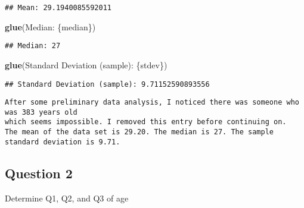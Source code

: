 \documentclass[
]{article}
\newenvironment{Shaded}{\begin{snugshade}}{\end{snugshade}}
\newcommand{\AttributeTok}[1]{\textcolor[rgb]{0.13,0.29,0.53}{#1}}
\newcommand{\CommentTok}[1]{\textcolor[rgb]{0.56,0.35,0.01}{\textit{#1}}}
\newcommand{\ConstantTok}[1]{\textcolor[rgb]{0.56,0.35,0.01}{#1}}
\newcommand{\DecValTok}[1]{\textcolor[rgb]{0.00,0.00,0.81}{#1}}
\newcommand{\FloatTok}[1]{\textcolor[rgb]{0.00,0.00,0.81}{#1}}
\newcommand{\FunctionTok}[1]{\textcolor[rgb]{0.13,0.29,0.53}{\textbf{#1}}}
\newcommand{\NormalTok}[1]{#1}
\newcommand{\OtherTok}[1]{\textcolor[rgb]{0.56,0.35,0.01}{#1}}
\newcommand{\SpecialCharTok}[1]{\textcolor[rgb]{0.81,0.36,0.00}{\textbf{#1}}}
\newcommand{\StringTok}[1]{\textcolor[rgb]{0.31,0.60,0.02}{#1}}
\begin{document}
\begin{verbatim}
## Mean: 29.1940085592011
\end{verbatim}

\begin{Shaded}
\begin{Highlighting}[]
\FunctionTok{glue}\NormalTok{(}\StringTok{\textquotesingle{}Median: \{median\}\textquotesingle{}}\NormalTok{)}
\end{Highlighting}
\end{Shaded}

\begin{verbatim}
## Median: 27
\end{verbatim}

\begin{Shaded}
\begin{Highlighting}[]
\FunctionTok{glue}\NormalTok{(}\StringTok{\textquotesingle{}Standard Deviation (sample): \{stdev\}\textquotesingle{}}\NormalTok{)}
\end{Highlighting}
\end{Shaded}

\begin{verbatim}
## Standard Deviation (sample): 9.71152590893556
\end{verbatim}

\begin{verbatim}
After some preliminary data analysis, I noticed there was someone who was 383 years old
which seems impossible. I removed this entry before continuing on.
The mean of the data set is 29.20. The median is 27. The sample standard deviation is 9.71.
\end{verbatim}

\subsection{Question 2}\label{question-2}

Determine Q1, Q2, and Q3 of age

\begin{Shaded}
\end{Shaded}
\end{document}
